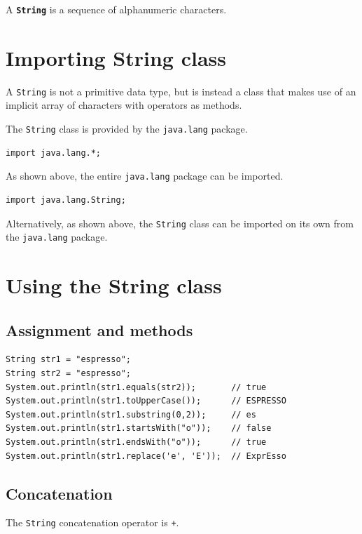 \documentclass[a4paper]{systems-software}
\begin{document}
A \textbf{\texttt{String}} is a sequence of alphanumeric characters.


\section*{Importing String class}

A \texttt{String} is not a primitive data type, but is instead a class that makes use of an implicit array of characters with operators as methods.

The \texttt{String} class is provided by the \texttt{java.lang} package.

\begin{lstlisting}[title={Importing the entire java.lang package.}]
import java.lang.*;
\end{lstlisting}

As shown above, the entire \texttt{java.lang} package can be imported.

\begin{lstlisting}[title={Importing the String class from the java.lang package.}]
import java.lang.String;
\end{lstlisting}

Alternatively, as shown above, the \texttt{String} class can be imported on its own from the \texttt{java.lang} package.


\section*{Using the String class}

\subsection*{Assignment and methods}

\begin{lstlisting}[title={Importing the String class from the java.lang package.}]
String str1 = "espresso";
String str2 = "espresso";
System.out.println(str1.equals(str2));       // true
System.out.println(str1.toUpperCase());      // ESPRESSO
System.out.println(str1.substring(0,2));     // es
System.out.println(str1.startsWith("o"));    // false
System.out.println(str1.endsWith("o"));      // true
System.out.println(str1.replace('e', 'E'));  // ExprEsso
\end{lstlisting}


\subsection*{Concatenation}
The \texttt{String} concatenation operator is \texttt{+}.
\end{document}
